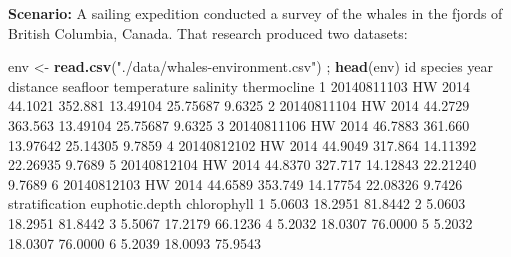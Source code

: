 \documentclass[
]{book}
\newenvironment{Shaded}{\begin{snugshade}}{\end{snugshade}}
\newcommand{\DecValTok}[1]{\textcolor[rgb]{0.00,0.00,0.81}{#1}}
\newcommand{\FloatTok}[1]{\textcolor[rgb]{0.00,0.00,0.81}{#1}}
\newcommand{\KeywordTok}[1]{\textcolor[rgb]{0.13,0.29,0.53}{\textbf{#1}}}
\newcommand{\NormalTok}[1]{#1}
\newcommand{\StringTok}[1]{\textcolor[rgb]{0.31,0.60,0.02}{#1}}
\begin{document}
\textbf{Scenario:} A sailing expedition conducted a survey of the whales in the fjords of British Columbia, Canada. That research produced two datasets:

\begin{Shaded}
\begin{Highlighting}[]
\NormalTok{env <-}\StringTok{ }\KeywordTok{read.csv}\NormalTok{(}\StringTok{"./data/whales-environment.csv"}\NormalTok{) ; }\KeywordTok{head}\NormalTok{(env)}
\NormalTok{           id species year distance seafloor temperature salinity thermocline}
\DecValTok{1} \DecValTok{20140811103}\NormalTok{      HW }\DecValTok{2014}  \FloatTok{44.1021}  \FloatTok{352.881}    \FloatTok{13.49104} \FloatTok{25.75687}      \FloatTok{9.6325}
\DecValTok{2} \DecValTok{20140811104}\NormalTok{      HW }\DecValTok{2014}  \FloatTok{44.2729}  \FloatTok{363.563}    \FloatTok{13.49104} \FloatTok{25.75687}      \FloatTok{9.6325}
\DecValTok{3} \DecValTok{20140811106}\NormalTok{      HW }\DecValTok{2014}  \FloatTok{46.7883}  \FloatTok{361.660}    \FloatTok{13.97642} \FloatTok{25.14305}      \FloatTok{9.7859}
\DecValTok{4} \DecValTok{20140812102}\NormalTok{      HW }\DecValTok{2014}  \FloatTok{44.9049}  \FloatTok{317.864}    \FloatTok{14.11392} \FloatTok{22.26935}      \FloatTok{9.7689}
\DecValTok{5} \DecValTok{20140812104}\NormalTok{      HW }\DecValTok{2014}  \FloatTok{44.8370}  \FloatTok{327.717}    \FloatTok{14.12843} \FloatTok{22.21240}      \FloatTok{9.7689}
\DecValTok{6} \DecValTok{20140812103}\NormalTok{      HW }\DecValTok{2014}  \FloatTok{44.6589}  \FloatTok{353.749}    \FloatTok{14.17754} \FloatTok{22.08326}      \FloatTok{9.7426}
\NormalTok{  stratification euphotic.depth chlorophyll}
\DecValTok{1}         \FloatTok{5.0603}        \FloatTok{18.2951}     \FloatTok{81.8442}
\DecValTok{2}         \FloatTok{5.0603}        \FloatTok{18.2951}     \FloatTok{81.8442}
\DecValTok{3}         \FloatTok{5.5067}        \FloatTok{17.2179}     \FloatTok{66.1236}
\DecValTok{4}         \FloatTok{5.2032}        \FloatTok{18.0307}     \FloatTok{76.0000}
\DecValTok{5}         \FloatTok{5.2032}        \FloatTok{18.0307}     \FloatTok{76.0000}
\DecValTok{6}         \FloatTok{5.2039}        \FloatTok{18.0093}     \FloatTok{75.9543}


\end{Highlighting}
\end{Shaded}
\end{document}
